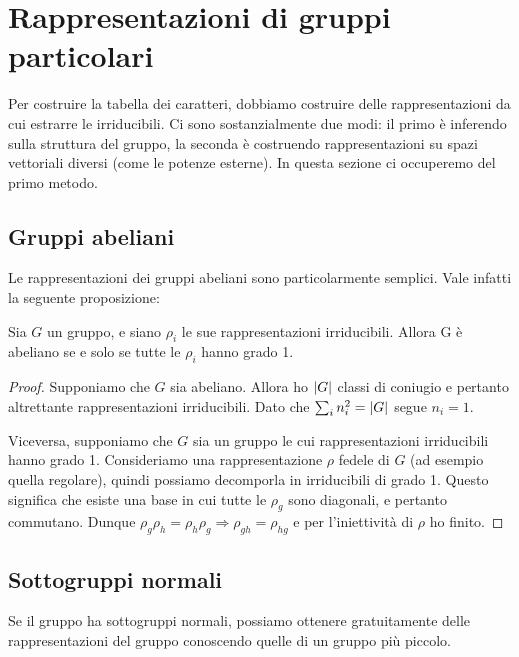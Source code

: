 \section{Rappresentazioni di gruppi particolari}
	Per costruire la tabella dei caratteri, dobbiamo costruire delle rappresentazioni da cui estrarre le irriducibili. Ci sono sostanzialmente due modi: il primo è inferendo sulla struttura del gruppo, la seconda è costruendo rappresentazioni su spazi vettoriali diversi (come le potenze esterne). In questa sezione ci occuperemo del primo metodo.
	
	\subsection{Gruppi abeliani}
		Le rappresentazioni dei gruppi abeliani sono particolarmente semplici. Vale infatti la seguente proposizione:
		\begin{myprop}
			Sia $G$ un gruppo, e siano $\rho_i$ le sue rappresentazioni irriducibili. Allora G è abeliano se e solo se tutte le $\rho_i$ hanno grado 1.
		\end{myprop}
		
		\begin{proof}
			Supponiamo che $G$ sia abeliano. Allora ho $\left|G\right|$ classi di coniugio e pertanto altrettante rappresentazioni irriducibili. Dato che $\sum_i n_i^2 = \left|G\right|$ segue $n_i = 1$.
			
			Viceversa, supponiamo che $G$ sia un gruppo le cui rappresentazioni irriducibili hanno grado 1. Consideriamo una rappresentazione $\rho$ fedele di $G$ (ad esempio quella regolare), quindi possiamo decomporla in irriducibili di grado 1. Questo significa che esiste una base in cui tutte le $\rho_g$ sono diagonali, e pertanto commutano. Dunque $\rho_g\rho_h = \rho_h\rho_g \Rightarrow \rho_{gh} = \rho_{hg}$ e per l'iniettività di $\rho$ ho finito.
		\end{proof}
	\subsection{Sottogruppi normali}
		Se il gruppo ha sottogruppi normali, possiamo ottenere gratuitamente delle rappresentazioni del gruppo conoscendo quelle di un gruppo più piccolo.
		
